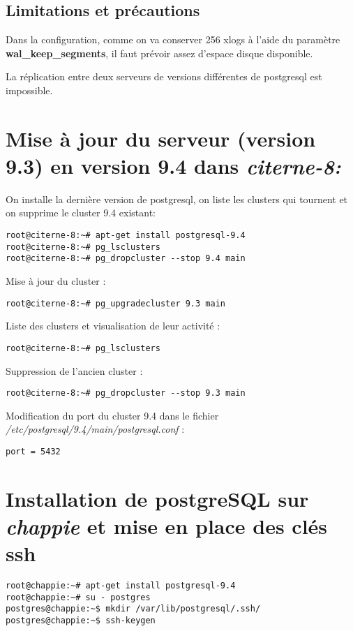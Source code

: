 \subsection{Limitations et précautions}
Dans la configuration, comme on va conserver 256 xlogs à l'aide du paramètre \textbf{wal\_keep\_segments}, il faut prévoir assez d'espace disque disponible.

La réplication entre deux serveurs de versions différentes de postgresql est impossible.

\section{Mise à jour du serveur (version 9.3) en version 9.4 dans \textit{citerne-8:}}

On installe la dernière version de postgresql, on liste les clusters qui tournent et on supprime le cluster 9.4 existant:

\begin{lstlisting}
root@citerne-8:~# apt-get install postgresql-9.4
root@citerne-8:~# pg_lsclusters
root@citerne-8:~# pg_dropcluster --stop 9.4 main
\end{lstlisting}

Mise à jour du cluster :

\begin{lstlisting}
root@citerne-8:~# pg_upgradecluster 9.3 main 
\end{lstlisting}

Liste des clusters et visualisation de leur activité : 
\begin{lstlisting}
root@citerne-8:~# pg_lsclusters
\end{lstlisting}

Suppression de l'ancien cluster :
\begin{lstlisting}
root@citerne-8:~# pg_dropcluster --stop 9.3 main
\end{lstlisting}

Modification du port du cluster 9.4 dans le fichier \textit{/etc/postgresql/9.4/main/postgresql.conf} :
\begin{lstlisting}
port = 5432
\end{lstlisting}


\section{Installation de postgreSQL sur \textit{chappie} et mise en place des clés ssh}
\begin{lstlisting}
root@chappie:~# apt-get install postgresql-9.4
root@chappie:~# su - postgres
postgres@chappie:~$ mkdir /var/lib/postgresql/.ssh/
postgres@chappie:~$ ssh-keygen
\end{lstlisting}

